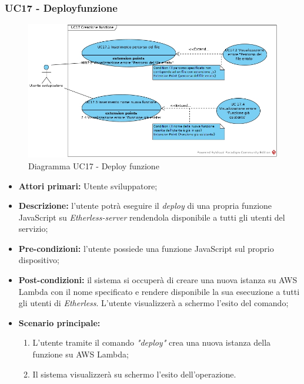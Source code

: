 \subsubsection{UC17 - Deploy\glo funzione}
\begin{figure}[h]
	\centering
	\includegraphics[width=\linewidth]{res/img/UC17.jpg}
	\caption{Diagramma UC17 - Deploy funzione}
\end{figure}
\begin{itemize}
	\item \textbf{Attori primari:} Utente sviluppatore;
	\item \textbf{Descrizione:} l'utente potrà eseguire il \textit{deploy\glo} di una propria funzione JavaScript su \textit{Etherless-server} rendendola disponibile a tutti gli utenti del servizio;
	\item \textbf{Pre-condizioni:} l'utente possiede una funzione JavaScript sul proprio dispositivo;
	\item \textbf{Post-condizioni:} il sistema si occuperà di creare una nuova istanza su AWS Lambda con il nome specificato e rendere disponibile la sua esecuzione a tutti gli utenti di \textit{Etherless}. L'utente visualizzerà a schermo l'esito del comando;
	\item \textbf{Scenario principale:}
	\begin{enumerate}
		\item L'utente tramite il comando \textit{"deploy\glos"} crea una nuova istanza della funzione su AWS Lambda;
		\item Il sistema visualizzerà su schermo l'esito dell'operazione.
	\end{enumerate}
\end{itemize}
